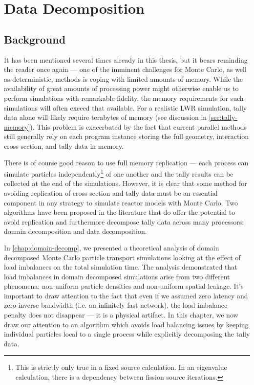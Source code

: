 \chapter{Data Decomposition}
\label{chap:data-decomp}

\section{Background}

It has been mentioned several times already in this thesis, but it bears
reminding the reader once again --- one of the imminent challenges for Monte
Carlo, as well as deterministic, methods is coping with limited amounts of
memory. While the availability of great amounts of processing power might
otherwise enable us to perform simulations with remarkable fidelity, the memory
requirements for such simulations will often exceed that available. For a
realistic LWR simulation, tally data alone will likely require terabytes of
memory (see discussion in \autoref{sec:tally-memory}). This problem is
exacerbated by the fact that current parallel methods still generally rely on
each program instance storing the full geometry, interaction cross section, and
tally data in memory.

There is of course good reason to use full memory replication --- each process
can simulate particles independently\footnote{This is strictly only true in a
  fixed source calculation. In an eigenvalue calculation, there is a dependency
  between fission source iterations.} of one another and the tally results can
be collected at the end of the simulations. However, it is clear that some
method for avoiding replication of cross section and tally data must be an
essential component in any strategy to simulate reactor models with Monte
Carlo. Two algorithms have been proposed in the literature that do offer the
potential to avoid replication and furthermore decompose tally data across many
processors: domain decomposition and data decomposition.

In \autoref{chap:domain-decomp}, we presented a theoretical analysis of domain
decomposed Monte Carlo particle transport simulations looking at the effect of
load imbalances on the total simulation time. The analysis demonstrated that
load imbalances in domain decomposed simulations arise from two different
phenomena: non-uniform particle densities and non-uniform spatial leakage. It's
important to draw attention to the fact that even if we assumed zero latency and
zero inverse bandwidth (i.e. an infinitely fast network), the load imbalance
penalty does not disappear --- it is a physical artifact. In this chapter, we
now draw our attention to an algorithm which avoids load balancing issues by
keeping individual particles local to a single process while explicitly
decomposing the tally data.

